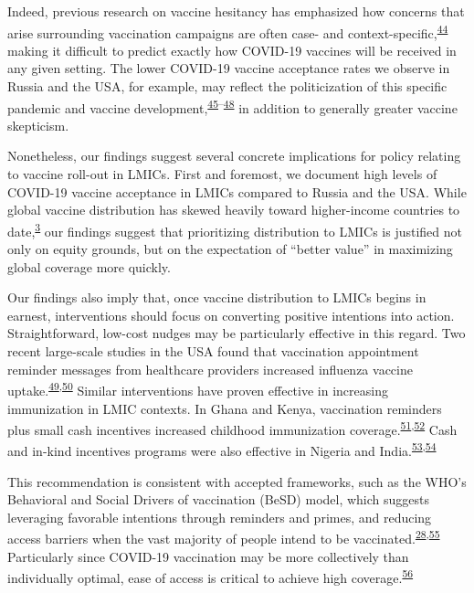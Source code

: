 \documentclass[
  12pt,
]{article}
\begin{document}
Indeed, previous research on vaccine hesitancy has emphasized how concerns that arise surrounding vaccination campaigns are often case- and context-specific,\textsuperscript{\protect\hyperlink{ref-larson2011addressing}{44}} making it difficult to predict exactly how COVID-19 vaccines will be received in any given setting. The lower COVID-19 vaccine acceptance rates we observe in Russia and the USA, for example, may reflect the politicization of this specific pandemic and vaccine development,\textsuperscript{\protect\hyperlink{ref-hornsey2020donald}{45}--\protect\hyperlink{ref-burki2020russian}{48}} in addition to generally greater vaccine skepticism.

Nonetheless, our findings suggest several concrete implications for policy relating to vaccine roll-out in LMICs. First and foremost, we document high levels of COVID-19 vaccine acceptance in LMICs compared to Russia and the USA. While global vaccine distribution has skewed heavily toward higher-income countries to date,\textsuperscript{\protect\hyperlink{ref-wouters2021challenges}{3}} our findings suggest that prioritizing distribution to LMICs is justified not only on equity grounds, but on the expectation of ``better value'' in maximizing global coverage more quickly.

Our findings also imply that, once vaccine distribution to LMICs begins in earnest, interventions should focus on converting positive intentions into action. Straightforward, low-cost nudges may be particularly effective in this regard. Two recent large-scale studies in the USA found that vaccination appointment reminder messages from healthcare providers increased influenza vaccine uptake.\textsuperscript{\protect\hyperlink{ref-milkmanetal2021a}{49},\protect\hyperlink{ref-milkmanetal2021b}{50}} Similar interventions have proven effective in increasing immunization in LMIC contexts. In Ghana and Kenya, vaccination reminders plus small cash incentives increased childhood immunization coverage.\textsuperscript{\protect\hyperlink{ref-levine2021}{51},\protect\hyperlink{ref-gibsonetal2017}{52}} Cash and in-kind incentives programs were also effective in Nigeria and India.\textsuperscript{\protect\hyperlink{ref-idinsight}{53},\protect\hyperlink{ref-Banerjee2010}{54}}

This recommendation is consistent with accepted frameworks, such as the WHO's Behavioral and Social Drivers of vaccination (BeSD) model, which suggests leveraging favorable intentions through reminders and primes, and reducing access barriers when the vast majority of people intend to be vaccinated.\textsuperscript{\protect\hyperlink{ref-whodata}{28},\protect\hyperlink{ref-brewer2017increasing}{55}} Particularly since COVID-19 vaccination may be more collectively than individually optimal, ease of access is critical to achieve high coverage.\textsuperscript{\protect\hyperlink{ref-betsch2013inviting}{56}}
\end{document}
